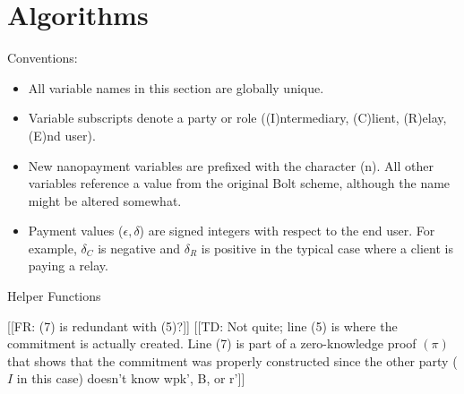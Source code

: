 \documentclass{article}
\newcommand{\flo}[1]{ {\color{blue} [[FR: #1]]}}
\newcommand{\thi}[1]{ {\color{red} [[TD: #1]]}}
\begin{document}
\section{Algorithms} \label{algorithms}

Conventions:
\begin{itemize}
\item All variable names in this section are globally unique.
\item Variable subscripts denote a party or role ((I)ntermediary,
  (C)lient, (R)elay, (E)nd user).
\item New nanopayment variables are prefixed with the character
  (n). All other variables reference a value from the original Bolt
  scheme, although the name might be altered somewhat.
\item Payment values ($\epsilon, \delta$) are signed integers with
  respect to the end user. For example, $\delta_C$ is negative and
  $\delta_R$ is positive in the typical case where a client is paying
  a relay.
\end{itemize}

\begin{algorithm}
  \begin{algorithmic}[1]
    \caption{Helper Functions}
    \EndFunction{}
  \end{algorithmic}
  \flo{(7) is redundant with (5)?}
  \thi{Not quite; line (5) is where the commitment is actually created. Line (7) is part of a zero-knowledge proof $(\pi)$ that shows that the commitment was properly constructed since the other party ($I$ in this case) doesn't know wpk', B, or r'}
\end{algorithm}
\end{document}
